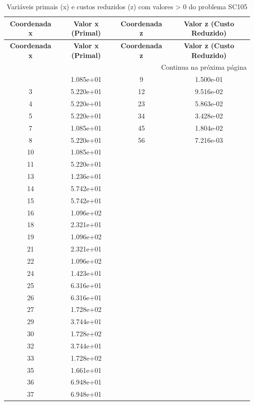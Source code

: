 \documentclass[12pt]{article}
\begin{document}
\begin{longtable}{@{}cccc@{}}
\caption{Variáveis primais (x) e custos reduzidos (z) com valores > 0 do problema SC105} \\
\toprule
\textbf{Coordenada x} & \textbf{Valor x (Primal)} & \textbf{Coordenada z} & \textbf{Valor z (Custo Reduzido)} \\
\midrule
\endfirsthead

\toprule
\textbf{Coordenada x} & \textbf{Valor x (Primal)} & \textbf{Coordenada z} & \textbf{Valor z (Custo Reduzido)} \\
\midrule
\endhead

\midrule \multicolumn{4}{r}{{Continua na próxima página}} \\ \midrule
\endfoot

\bottomrule
\endlastfoot
2 & 1.085e+01 & 9 & 1.500e-01 \\
3 & 5.220e+01 & 12 & 9.516e-02 \\
4 & 5.220e+01 & 23 & 5.863e-02 \\
5 & 5.220e+01 & 34 & 3.428e-02 \\
7 & 1.085e+01 & 45 & 1.804e-02 \\
8 & 5.220e+01 & 56 & 7.216e-03 \\
10 & 1.085e+01 &  &  \\
11 & 5.220e+01 &  &  \\
13 & 1.236e+01 &  &  \\
14 & 5.742e+01 &  &  \\
15 & 5.742e+01 &  &  \\
16 & 1.096e+02 &  &  \\
18 & 2.321e+01 &  &  \\
19 & 1.096e+02 &  &  \\
21 & 2.321e+01 &  &  \\
22 & 1.096e+02 &  &  \\
24 & 1.423e+01 &  &  \\
25 & 6.316e+01 &  &  \\
26 & 6.316e+01 &  &  \\
27 & 1.728e+02 &  &  \\
29 & 3.744e+01 &  &  \\
30 & 1.728e+02 &  &  \\
32 & 3.744e+01 &  &  \\
33 & 1.728e+02 &  &  \\
35 & 1.661e+01 &  &  \\
36 & 6.948e+01 &  &  \\
37 & 6.948e+01 &  &  \\

\end{longtable}
\end{document}
